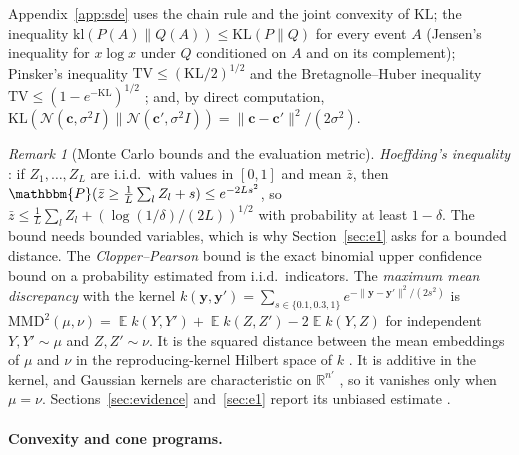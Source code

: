 \documentclass{article}
\DeclareMathOperator{\E}{\mathbb{E}}
\newcommand{\RR}{\mathbb{R}}
\newcommand{\PP}{\mathbbm{P}}
\newcommand{\cN}{\mathcal{N}}
\newcommand{\by}{\mathbf{y}}
\newcommand{\TV}{\mathrm{TV}}
\newcommand{\KL}{\mathrm{KL}}
\newcommand{\kl}{\mathrm{kl}}
\theoremstyle{plain}
\theoremstyle{remark}
\newtheorem{remark}[theorem]{Remark}
\begin{document}
Appendix~\ref{app:sde} uses the chain rule \citep[Thm.~2.5.3]{cover2006elements} and the joint convexity
\citep[Thm.~2.7.2]{cover2006elements} of $\KL$; the inequality $\kl(P(A)\|Q(A))\le\KL(P\|Q)$ for every event $A$ (Jensen's inequality for
$x\log x$ under $Q$ conditioned on $A$ and on its complement); Pinsker's inequality $\TV\le(\KL/2)^{1/2}$
\citep[Lemma~2.5]{tsybakov2009introduction} and the Bretagnolle--Huber inequality $\TV\le(1-e^{-\KL})^{1/2}$
\citep{bretagnolle1979estimation,canonne2022short}; and, by direct computation,
$\KL(\cN(\mathbf c,\sigma^2I)\|\cN(\mathbf c',\sigma^2I))=\|\mathbf c-\mathbf c'\|^2/(2\sigma^2)$.

\begin{remark}[Monte Carlo bounds and the evaluation metric]\label{rem:mc}
\emph{Hoeffding's inequality} \citep{hoeffding1963probability}: if $Z_1,\dots,Z_L$ are i.i.d.\ with values in $[0,1]$ and mean $\bar z$, then
$\PP(\bar z\ge\frac1L\sum_lZ_l+s)\le e^{-2Ls^2}$, so $\bar z\le\frac1L\sum_lZ_l+(\log(1/\delta)/(2L))^{1/2}$ with probability at least $1-\delta$. The bound
needs bounded variables, which is why Section~\ref{sec:e1} asks for a bounded distance. The \emph{Clopper--Pearson} bound
\citep{clopper1934use} is the exact binomial upper confidence bound on a probability estimated from i.i.d.\ indicators. The \emph{maximum
mean discrepancy} with the kernel $k(\by,\by')=\sum_{s\in\{0.1,0.3,1\}}e^{-\|\by-\by'\|^2/(2s^2)}$ is $\mathrm{MMD}^2(\mu,\nu)=\E k(Y,Y')+\E k(Z,Z')-2\E k(Y,Z)$
for independent $Y,Y'\sim\mu$ and $Z,Z'\sim\nu$. It is the squared distance between the mean embeddings of $\mu$ and $\nu$ in the
reproducing-kernel Hilbert space of $k$ \citep[Lemmas~4 and~6]{gretton2012kernel}. It is additive in the kernel, and Gaussian kernels are
characteristic on $\RR^{n'}$ \citep[Sec.~2.2]{gretton2012kernel}, so it vanishes only when $\mu=\nu$. Sections~\ref{sec:evidence}
and~\ref{sec:e1} report its unbiased estimate \citep[Lemma~6]{gretton2012kernel}.
\end{remark}

\paragraph{Convexity and cone programs.}
\end{document}
